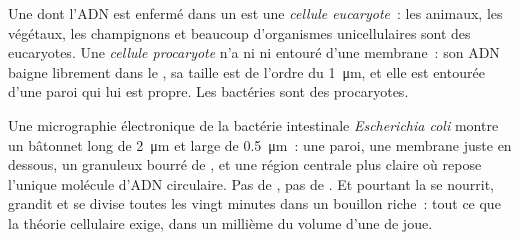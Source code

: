 \begin{definition}\label{def:g10:cells-common-unit:prokaryote}
Une  dont l'ADN est enfermé dans un  est une
\emph{cellule eucaryote}~: les animaux, les
végétaux, les champignons et beaucoup d'organismes unicellulaires sont
des eucaryotes. Une
\emph{cellule procaryote} n'a ni  ni
 entouré d'une membrane~: son ADN baigne librement dans le
, sa taille est de l'ordre du \qty{1}{\micro m}, et elle est
entourée d'une paroi qui lui est propre. Les bactéries sont des
procaryotes.
\end{definition}

\begin{example}\label{ex:g10:cells-common-unit:bacterium}
Une micrographie électronique de la bactérie intestinale
\emph{Escherichia coli} montre un bâtonnet long de \qty{2}{\micro m} et
large de \qty{0.5}{\micro m}~: une paroi, une membrane juste en
dessous, un  granuleux bourré de , et une région
centrale plus claire où repose l'unique molécule d'ADN circulaire. Pas
de , pas de . Et pourtant la  se nourrit,
grandit et se divise toutes les vingt minutes dans un bouillon riche~:
tout ce que la théorie cellulaire exige, dans un millième du volume
d'une  de joue.
\end{example}

